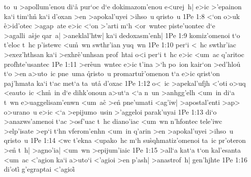 to~u
>apollum'enou
di`a\r{}
pur`oc
d`e
dokimazom'enou
e<urej~h|
e>ic
>'epainon
ka`i
tim`hn\r{}
ka`i
d'oxan
>en
>apokal'uyei
>ihso~u
qristo~u\bibvsend
\vs 1Pe 1:8
<`on
o>uk
\r{e}>id'otec
>agap~ate
e>ic
<`on
>'arti
m`h
<or~wntec
piste'uontec
d`e
>agalli~a\r{s}je
qar~a|
>aneklal'htw|
ka`i
dedoxasm'enh|\bibvsend
\vs 1Pe 1:9
komiz'omenoi
t`o
t'eloc
t~hc
p'istewc
<u\r{m}~wn
swthr'ian
yuq~wn\bibvsend
\vs 1Pe 1:10
per`i
<~hc
swthr'iac
>exez'hthsan
ka`i
>exhr\r{e}'unhsan
prof~htai
o<i
per`i
t~hc
e>ic
<um~ac
q'aritoc
profhte'usantec\bibvsend
\vs 1Pe 1:11
>er\r{e}un~wntec
e>ic
t'ina
>`h
po~ion
kair`on
>ed'hlou\r{}
t`o
>en
a>uto~ic
pne~uma
\r{q}risto~u
promartu\r{r}'omenon
t`a
e>ic
qrist`on
paj'hmata
ka`i
t`ac
met`a
ta~ut\r{a}
d'oxac\bibvsend
\vs 1Pe 1:12
o<~ic
>apekal'ufjh
<'oti
o>uq
<eauto~ic
<h\r{m}~in
d`e
dihk'onoun
a>ut`a
<`a
n~un
>anhgg'elh
<um~in
di`a
t~wn
e>uaggelisam'enwn
<um~a\r{c}
>e\r{n}
pne'umati
<ag'iw|
>apostal'enti
>ap>
o>urano~u
e>ic
<`a
>epijumo~usin
>'aggeloi
parak'uyai\bibvsend
\vs 1Pe 1:13
di`o
>anazws'amenoi
t`ac
>osf'uac
t~hc
diano'iac
<um~wn
n'hfontec
tele'iwc
>elp'isate
>ep`i
t`hn
vferom'enhn
<um~in
q'arin
>en
>apokal'uyei
>ihso~u
qristo~u\bibvsend
\vs 1Pe 1:14
<wc
t'ekna
<upako~hc
m`h
su\r{s}qhmatiz'omenoi
ta~ic
pr'oteron
>en\r{}
t~h|
>agno'ia|
<um~wn
>epijum'iaic\bibvsend
\vs 1Pe 1:15
>all`a
kat`a
t`on
kal'esanta
<um~ac
<'agion
ka`i
a>uto`i
<'agioi
>en
p'ash|
>anastrof~h|
gen'hjhte\bibvsend
\vs 1Pe 1:16
di'oti\r{}
g'egraptai
<'agioi\r{}
